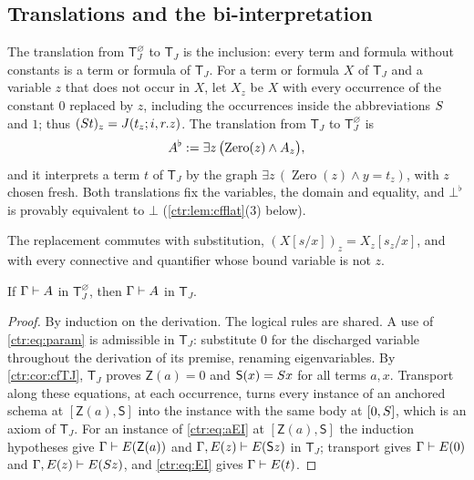 \subsection{Translations and the bi-interpretation}

\begin{definition}[Translations]\label{ctr:def:cftrans}
The translation from $\mathsf T_J^{\varnothing}$ to $\mathsf T_J$ is the inclusion: every
term and formula without constants is a term or formula of $\mathsf T_J$. For a term or
formula $X$ of $\mathsf T_J$ and a variable $z$ that does not occur in $X$, let $X_z$ be
$X$ with every occurrence of the constant $0$ replaced by $z$, including the occurrences
inside the abbreviations $S$ and $1$; thus $(S t)_z=J(t_z;i,r.z)$. The translation
from $\mathsf T_J$ to $\mathsf T_J^{\varnothing}$ is
\[
 A^\flat\mathrel{:=}\exists z\,\bigl(\operatorname{Zero}(z)\land A_z\bigr),
\]
and it interprets a term $t$ of $\mathsf T_J$ by the graph
$\exists z\,(\operatorname{Zero}(z)\land y=t_z)$, with $z$ chosen fresh. Both translations
fix the variables, the domain and equality, and $\bot^\flat$ is provably equivalent to $\bot$
(\cref{ctr:lem:cfflat}(3) below).
\end{definition}

The replacement commutes with substitution, $(X[s/x])_z=X_z[s_z/x]$, and with every
connective and quantifier whose bound variable is not $z$.

\begin{lemma}[Inclusion]\label{ctr:lem:cfdown}
If $\Gamma\vdash A$ in $\mathsf T_J^{\varnothing}$, then $\Gamma\vdash A$ in
$\mathsf T_J$.
\end{lemma}
\begin{proof}
By induction on the derivation. The logical rules are shared. A use of \eqref{ctr:eq:param}
is admissible in $\mathsf T_J$: substitute $0$ for the discharged variable throughout the
derivation of its premise, renaming eigenvariables. By \cref{ctr:cor:cfTJ}, $\mathsf T_J$
proves $\mathsf Z(a)=0$ and $\mathsf S(x)=S x$ for all terms $a,x$. Transport along these
equations, at each occurrence, turns every instance of an anchored schema at
$[\mathsf Z(a),\mathsf S]$ into the instance with the same body at $[0,S]$, which is an
axiom of $\mathsf T_J$. For an instance of \eqref{ctr:eq:aEI} at $[\mathsf Z(a),\mathsf S]$
the induction hypotheses give $\Gamma\vdash E(\mathsf Z(a))$ and
$\Gamma,E(z)\vdash E(\mathsf S z)$ in $\mathsf T_J$; transport gives
$\Gamma\vdash E(0)$ and $\Gamma,E(z)\vdash E(S z)$, and \eqref{ctr:eq:EI} gives
$\Gamma\vdash E(t)$.
\end{proof}

